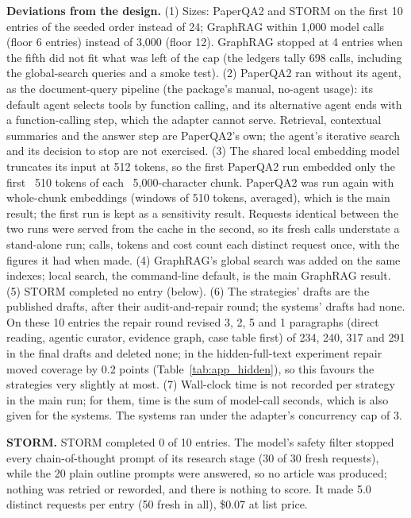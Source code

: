 \documentclass{article} %
\begin{document}
\textbf{Deviations from the design.} (1) Sizes: PaperQA2 and STORM on the first 10 entries of the seeded order instead of 24; GraphRAG within 1,000 model calls (floor 6 entries) instead of 3,000 (floor 12). GraphRAG stopped at 4 entries when the fifth did not fit what was left of the cap (the ledgers tally 698 calls, including the global-search queries and a smoke test). (2) PaperQA2 ran without its agent, as the document-query pipeline (the package's manual, no-agent usage): its default agent selects tools by function calling, and its alternative agent ends with a function-calling step, which the adapter cannot serve. Retrieval, contextual summaries and the answer step are PaperQA2's own; the agent's iterative search and its decision to stop are not exercised. (3) The shared local embedding model truncates its input at 512 tokens, so the first PaperQA2 run embedded only the first ~510 tokens of each ~5,000-character chunk. PaperQA2 was run again with whole-chunk embeddings (windows of 510 tokens, averaged), which is the main result; the first run is kept as a sensitivity result. Requests identical between the two runs were served from the cache in the second, so its fresh calls understate a stand-alone run; calls, tokens and cost count each distinct request once, with the figures it had when made. (4) GraphRAG's global search was added on the same indexes; local search, the command-line default, is the main GraphRAG result. (5) STORM completed no entry (below). (6) The strategies' drafts are the published drafts, after their audit-and-repair round; the systems' drafts had none. On these 10 entries the repair round revised 3, 2, 5 and 1 paragraphs (direct reading, agentic curator, evidence graph, case table first) of 234, 240, 317 and 291 in the final drafts and deleted none; in the hidden-full-text experiment repair moved coverage by 0.2 points (Table~\ref{tab:app_hidden}), so this favours the strategies very slightly at most. (7) Wall-clock time is not recorded per strategy in the main run; for them, time is the sum of model-call seconds, which is also given for the systems. The systems ran under the adapter's concurrency cap of 3.

\textbf{STORM.} STORM completed 0 of 10 entries. The model's safety filter stopped every chain-of-thought prompt of its research stage (30 of 30 fresh requests), while the 20 plain outline prompts were answered, so no article was produced; nothing was retried or reworded, and there is nothing to score. It made 5.0 distinct requests per entry (50 fresh in all), \$0.07 at list price.
\end{document}
